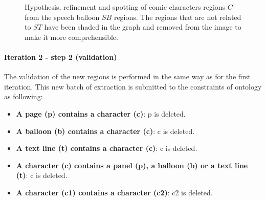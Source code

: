\begin{figure}[!ht]
  \caption[Hypothesis, refinement and spotting of comic character regions from the speech balloon regions]{Hypothesis, refinement and spotting of comic characters regions $C$ from the speech balloon $SB$ regions. The regions that are not related to $ST$ have been shaded in the graph and removed from the image to make it more comprehensible.
  }
  \label{fig:kn:graph_character_region}
 \end{figure}



\paragraph{Iteration 2 - step 2 (validation)} %
\label{par:step_5}

The validation of the new regions is performed in the same way as for the first iteration.
This new batch of extraction is submitted to the constraints of ontology as following:

\begin{itemize}
  \item \textbf{A page (p) contains a character (c)}: p is deleted.
  \item \textbf{A balloon (b) contains a character (c)}: c is deleted.
  \item \textbf{A text line (t) contains a character (c)}: c is deleted.
  \item \textbf{A character (c) contains a panel (p), a balloon (b) or a text line (t)}: c is deleted.  
  \item \textbf{A character (c1) contains a character (c2)}: c2 is deleted.
\end{itemize}
  
